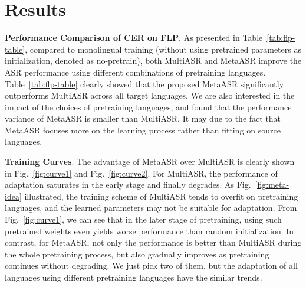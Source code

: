 \section{Results}
\label{sec:results}

\label{ssec:multitask-baseline}

\textbf{Performance Comparison of CER on FLP}. As presented in Table~\ref{tab:flp-table}, compared to monolingual training (without using pretrained parameters as initialization, denoted as no-pretrain), both MultiASR and MetaASR improve the ASR performance using different combinations of pretraining languages. Table~\ref{tab:flp-table} clearly showed that the proposed MetaASR significantly outperforms MultiASR across all target languages. We are also interested in the impact of the choices of pretraining languages, and found that the performance variance of MetaASR is smaller than MultiASR. It may due to the fact that MetaASR focuses more on the learning process rather than fitting on source languages. 





\noindent
\textbf{Training Curves}. The advantage of MetaASR over MultiASR is clearly shown in Fig.~\ref{fig:curve1} and Fig.~\ref{fig:curve2}. For MultiASR, the performance of adaptation saturates in the early stage and finally degrades.  As Fig.~\ref{fig:meta-idea} illustrated, the training scheme of MultiASR tends to overfit on pretraining languages, and the learned parameters may not be suitable for adaptation. From Fig.~\ref{fig:curve1}, we can see that in the later stage of pretraining, using such pretrained weights even yields worse performance than random initialization. In contrast, for MetaASR, not only the performance is better than MultiASR during the whole pretraining process, but also gradually improves as pretraining continues without degrading. We just pick two of them, but the adaptation of all languages using different pretraining languages have the similar trends.

